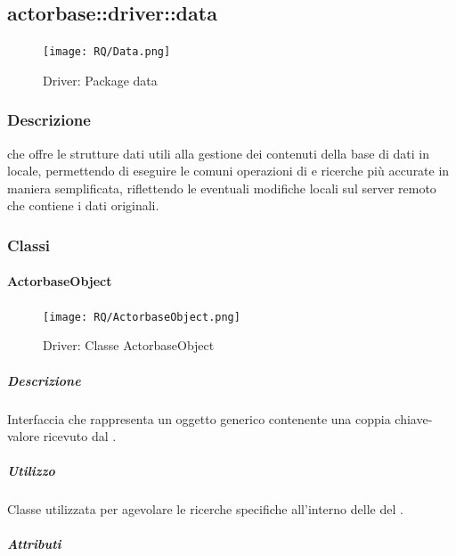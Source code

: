 \documentclass{scalatekids-article}
\begin{document}

\subsection{actorbase::driver::data}
\label{sec:actorbase::driver::data}

\begin{figure}[H]
  \begin{center}
    \texttt{[image: RQ/Data.png]}
    \caption{Driver: Package data}
  \end{center}
\end{figure}

\subsubsection{Descrizione}

 che offre le strutture dati utili alla gestione dei contenuti
della base di dati in locale, permettendo di eseguire le comuni operazioni di
 e ricerche più accurate in maniera semplificata, riflettendo le
eventuali modifiche locali sul server remoto che contiene i dati originali.

\subsubsection{Classi}

\paragraph{ActorbaseObject}
\label{sec:actorbase::driver::data::ActorbaseObject}

\begin{figure}[H]
  \begin{center}
    \texttt{[image: RQ/ActorbaseObject.png]}
    \caption{Driver: Classe ActorbaseObject}
  \end{center}
\end{figure}

\subparagraph{Descrizione}

Interfaccia che rappresenta un oggetto generico contenente una coppia
chiave-valore ricevuto dal .

\subparagraph{Utilizzo}

Classe utilizzata per agevolare le ricerche specifiche all'interno delle
 del .

\subparagraph{Attributi}
\end{document}
